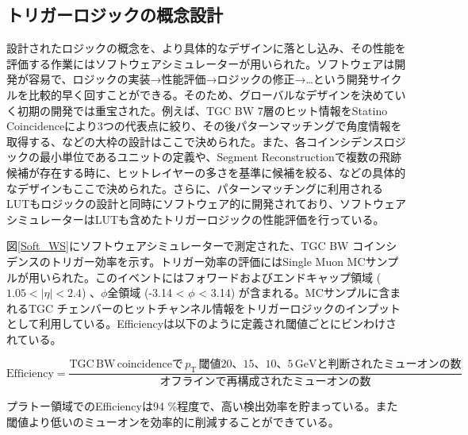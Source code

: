 \subsection*{トリガーロジックの概念設計}
設計されたロジックの概念を、より具体的なデザインに落とし込み、その性能を評価する作業にはソフトウェアシミュレーターが用いられた。ソフトウェアは開発が容易で、ロジックの実装→性能評価→ロジックの修正→…という開発サイクルを比較的早く回すことができる。そのため、グローバルなデザインを決めていく初期の開発では重宝された。例えば、TGC BW 7層のヒット情報をStatino Coincidenceにより3つの代表点に絞り、その後パターンマッチングで角度情報を取得する、などの大枠の設計はここで決められた。また、各コインシデンスロジックの最小単位であるユニットの定義や、Segment Reconstructionで複数の飛跡候補が存在する時に、ヒットレイヤーの多さを基準に候補を絞る、などの具体的なデザインもここで決められた。さらに、パターンマッチングに利用されるLUTもロジックの設計と同時にソフトウェア的に開発されており、ソフトウェアシミュレーターはLUTも含めたトリガーロジックの性能評価を行っている。

図\ref{Soft_WS}にソフトウェアシミュレーターで測定された、TGC BW コインシデンスのトリガー効率を示す。トリガー効率の評価にはSingle Muon MCサンプルが用いられた。このイベントにはフォワードおよびエンドキャップ領域 ($1.05 < | \eta | < 2.4$) 、$\phi$全領域 (-3.14 < $\phi$ < 3.14) が含まれる。MCサンプルに含まれるTGC チェンバーのヒットチャンネル情報をトリガーロジックのインプットとして利用している。Efficiencyは以下のように定義され\pt 閾値ごとにビンわけされている。

\begin{equation}
\mathrm{Efficiency} = \frac{\mathrm{TGC\,BW\,coincidenceで}\,p_{\mathrm{T}}\,閾値20、15、10、5\,\mathrm{GeV}と判断されたミューオンの数}{オフラインで再構成されたミューオンの数}
\end{equation}

プラトー領域でのEfficiencyは94 \%程度で、高い検出効率を貯まっている。また閾値より低い\pt のミューオンを効率的に削減することができている。

